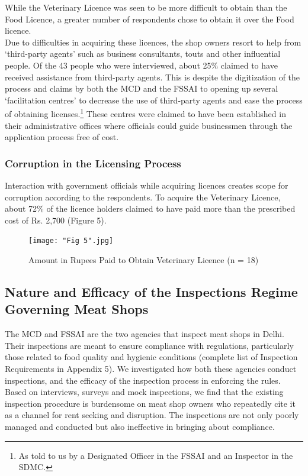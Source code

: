 \documentclass[a4paper, 12pt]{article}
\begin{document}
While the Veterinary Licence was seen to be more difficult to obtain than the Food Licence, a greater number of respondents chose to obtain it over the Food licence. \\

Due to difficulties in acquiring these licences, the shop owners resort to help from ‘third-party agents’ such as business consultants, touts and other influential people. Of the 43 people who were interviewed, about 25\% claimed to have received assistance from third-party agents. This is despite the digitization of the process and claims by both the MCD and the FSSAI to opening up several ‘facilitation centres’ to decrease the use of third-party agents and ease the process of obtaining licenses.\footnote{ As told to us by a Designated Officer in the FSSAI and an Inspector in the SDMC.} These centres were claimed to have been established in their administrative offices where officials could guide businessmen through the application process free of cost. \\

\subsubsection{Corruption in the Licensing Process}

Interaction with government officials while acquiring licences creates scope for corruption according to the respondents. To acquire the Veterinary Licence, about 72\% of the licence holders claimed to have paid more than the prescribed cost of Rs. 2,700 (Figure 5).\\

\begin{figure}[H]
\centering
\texttt{[image: "Fig 5".jpg]}
\caption[Optional Caption]{Amount in Rupees Paid to Obtain Veterinary Licence (n = 18)}
\end{figure} 

\subsection{Nature and Efficacy of the Inspections Regime Governing Meat Shops}

The MCD and FSSAI are the two agencies that inspect meat shops in Delhi. Their inspections are meant to ensure compliance with regulations, particularly those related to food quality and hygienic conditions (complete list of Inspection Requirements in Appendix 5). We investigated how both these agencies conduct inspections, and the efficacy of the inspection process in enforcing the rules. Based on interviews, surveys and mock inspections, we find that the existing inspection procedure is burdensome on meat shop owners who repeatedly cite it as a channel for rent seeking and disruption. The inspections are not only poorly managed and conducted but also ineffective in bringing about compliance. \\
\end{document}

